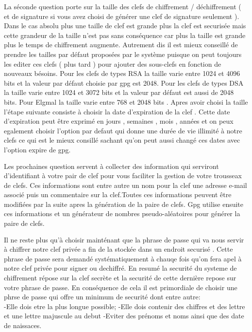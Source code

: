 La séconde question porte sur la taille des clefs de chiffrement / déchiffrement ( et de signature si vous avez choisi de générer une 
clef de signature seulement ).
Dans le cas absolu plus une taille de clef est grande plus la clef est securisée mais cette grandeur de la taille n'est pas sans 
conséquence car plus la taille est grande plus le temps de chiffrement augmente. Autrement dis il est mieux conseillé de prendre les
tailles par défaut proposées par le système puisque on peut toujours les editer ces clefs ( plus tard ) pour ajouter des sous-clefs en 
fonction de nouveaux bésoins. 
Pour les clefs de types RSA la taille varie entre 1024 et 4096 bits et la valeur par défaut choisie par gpg est 2048.
Pour les clefs de types DSA la taille varie entre 1024 et 3072 bits et la valeur par défaut est aussi de 2048 bits.
Pour Elgmal la taille varie entre 768 et 2048 bits .
Apres avoir choisi la taille l'étape suivante consiste à choisir la date d'expiration de la clef .
Cette date d'expiration peut être exprimé en jours , semaines , mois , années et on peux egalement choisir l'option par defaut qui 
donne une durée de vie illimité à notre clefs ce qui est le mieux consillé sachant qu'on peut aussi changé ces  dates avec l'option 
expire de gpg.

Les prochaines question servent à collecter des information qui serviront d'identifiant à votre pair de clef pour vous faciliter la
gestion de votre trousseax de clefs. Ces informations sont entre autre un nom pour la clef une adresse e-mail associé puis un commentaire 
sur la clef.Toutes ces informations peuvent être modifiées par la suite apres la génération de la paire de clefs.
Gpg utilise ensuite ces informations et un générateur de nombres pseudo-aléatoires pour générer la paire de clefs.

Il ne reste plus qu'à choisir mainténant que la phrase de passe qui va nous servir à chiffrer notre clef privée a fin de la stockée 
dans un endroit securisé . Cette phrase de passe sera demandé systématiquement à chauqe fois qu'on fera apel à notre clef privée pour
signer ou dechiffré.
En resumé la securité du systeme de chiffrement répose sur la clef secrète et la securité de cette dernière repose sur votre 
phrase de passe.
En  conséquence de cela il est primordiale de choisir une phrse de passe qui offre un minimum de securité dont entre autre:\\
-Elle dois etre la plus longue possible;
-Elle dois contenir des chiffres et des lettre et une lettre majuscule au debut
-Eviter des prénoms et noms ainsi que des date de naissaces. 

